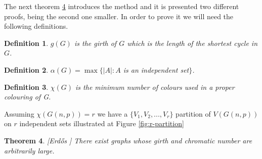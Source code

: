 \documentclass[12pt,twoside,a4paper,bibliography=totocnumbered]{book}
\numberwithin{equation}{section}
\newtheorem{theorem}             {Theorem}[section]
\newtheorem{definition}	[theorem] {Definition}
\theoremstyle{remark}
\begin{document}


The next theorem \ref{erdoss} introduces the method and it is presented two different proofs, being the second one smaller. In order to prove it we will need the following definitions.

\begin{definition}\label{def:girth}
$g(G)$ is the girth of $G$ which is the length of the shortest cycle in $G$. 
\end{definition}
\begin{definition}\label{def:independencenumber}
$\alpha(G) = \max\{|A|: A$ is an independent set$\}$.
\end{definition}
\begin{definition}\label{def:chromaticnumber}
$\chi(G)$ is the minimum number of colours used in a proper colouring of G.
\end{definition}
Assuming $\chi(G(n,p)) = r$ we have a $\{V_1,V_2,...,V_r\}$ partition of $V(G(n,p))$ on $r$ independent sets illustrated at Figure \ref{fig:r-partition}


\begin{theorem}\label{erdoss}[{Erd\H{o}s \cite{Er59}}] There exist graphs whose girth and chromatic number are arbitrarily large.
\end{theorem}
\end{document}
